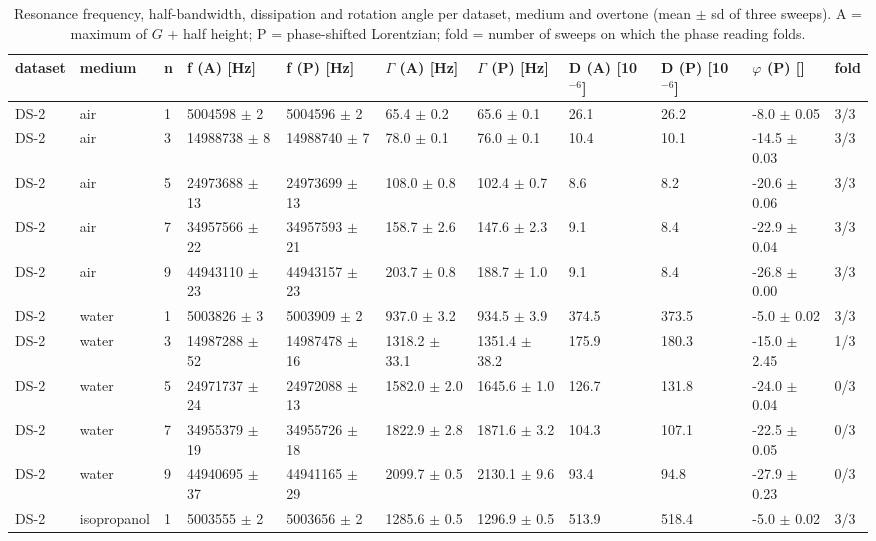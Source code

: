 \documentclass[11pt,a4paper]{article}
\begin{document}
\begin{landscape}{\scriptsize\setlength{\tabcolsep}{2pt}
\begin{longtable}{@{}lllllllllll@{}}
\caption{Resonance frequency, half-bandwidth, dissipation and rotation angle per dataset, medium and overtone (mean $\pm$ sd of three sweeps). A = maximum of $G$ + half height; P = phase-shifted Lorentzian; fold = number of sweeps on which the phase reading folds.}\\
\toprule
dataset & medium & n & f (A) [Hz] & f (P) [Hz] & $\Gamma$ (A) [Hz] & $\Gamma$ (P) [Hz] & D (A) [10$^{-6}$] & D (P) [10$^{-6}$] & $\varphi$ (P) [\textdegree{}] & fold \\\midrule\endhead
DS-2 & air & 1 & 5004598 $\pm$ 2 & 5004596 $\pm$ 2 & 65.4 $\pm$ 0.2 & 65.6 $\pm$ 0.1 & 26.1 & 26.2 & -8.0 $\pm$ 0.05 & 3/3 \\
DS-2 & air & 3 & 14988738 $\pm$ 8 & 14988740 $\pm$ 7 & 78.0 $\pm$ 0.1 & 76.0 $\pm$ 0.1 & 10.4 & 10.1 & -14.5 $\pm$ 0.03 & 3/3 \\
DS-2 & air & 5 & 24973688 $\pm$ 13 & 24973699 $\pm$ 13 & 108.0 $\pm$ 0.8 & 102.4 $\pm$ 0.7 & 8.6 & 8.2 & -20.6 $\pm$ 0.06 & 3/3 \\
DS-2 & air & 7 & 34957566 $\pm$ 22 & 34957593 $\pm$ 21 & 158.7 $\pm$ 2.6 & 147.6 $\pm$ 2.3 & 9.1 & 8.4 & -22.9 $\pm$ 0.04 & 3/3 \\
DS-2 & air & 9 & 44943110 $\pm$ 23 & 44943157 $\pm$ 23 & 203.7 $\pm$ 0.8 & 188.7 $\pm$ 1.0 & 9.1 & 8.4 & -26.8 $\pm$ 0.00 & 3/3 \\
DS-2 & water & 1 & 5003826 $\pm$ 3 & 5003909 $\pm$ 2 & 937.0 $\pm$ 3.2 & 934.5 $\pm$ 3.9 & 374.5 & 373.5 & -5.0 $\pm$ 0.02 & 3/3 \\
DS-2 & water & 3 & 14987288 $\pm$ 52 & 14987478 $\pm$ 16 & 1318.2 $\pm$ 33.1 & 1351.4 $\pm$ 38.2 & 175.9 & 180.3 & -15.0 $\pm$ 2.45 & 1/3 \\
DS-2 & water & 5 & 24971737 $\pm$ 24 & 24972088 $\pm$ 13 & 1582.0 $\pm$ 2.0 & 1645.6 $\pm$ 1.0 & 126.7 & 131.8 & -24.0 $\pm$ 0.04 & 0/3 \\
DS-2 & water & 7 & 34955379 $\pm$ 19 & 34955726 $\pm$ 18 & 1822.9 $\pm$ 2.8 & 1871.6 $\pm$ 3.2 & 104.3 & 107.1 & -22.5 $\pm$ 0.05 & 0/3 \\
DS-2 & water & 9 & 44940695 $\pm$ 37 & 44941165 $\pm$ 29 & 2099.7 $\pm$ 0.5 & 2130.1 $\pm$ 9.6 & 93.4 & 94.8 & -27.9 $\pm$ 0.23 & 0/3 \\
DS-2 & isopropanol & 1 & 5003555 $\pm$ 2 & 5003656 $\pm$ 2 & 1285.6 $\pm$ 0.5 & 1296.9 $\pm$ 0.5 & 513.9 & 518.4 & -5.0 $\pm$ 0.02 & 3/3 \\

\end{longtable}}
\end{landscape}
\end{document}
